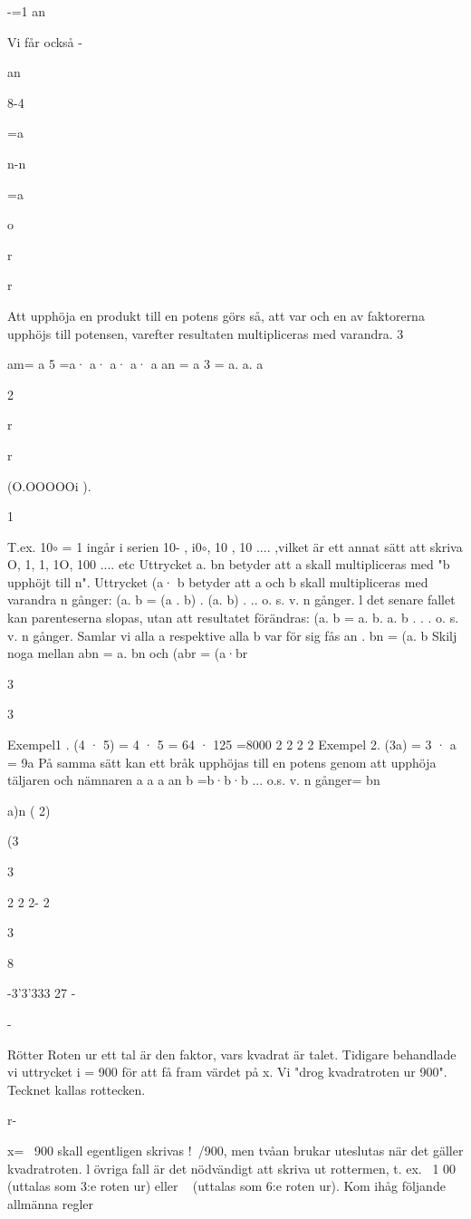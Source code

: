 -=1
an

Vi får också -

an

8-4

=a

n-n

=a

o

r

r

Att upphöja en produkt till en potens görs
så, att var och en av faktorerna upphöjs
till potensen, varefter resultaten multipliceras med varandra.
3

am= a 5 =a· a· a· a· a
an = a 3 = a. a. a

2

r

r

(O.OOOOOi ).

1

T.ex. 10$\circ$ = 1 ingår i serien 10- , i0$\circ$, 10 , 10
.... ,vilket är ett annat sätt att skriva O, 1, 1, 1O,
100 .... etc
Uttrycket a. bn betyder att a skall multipliceras med "b upphöjt till n".
Uttrycket (a· b betyder att a och b skall
multipliceras med varandra n gånger:
(a. b = (a . b) . (a. b) . .. o. s. v. n gånger.
l det senare fallet kan parenteserna slopas,
utan att resultatet förändras:
(a. b = a. b. a. b . . . o. s. v. n gånger.
Samlar vi alla a respektive alla b var för sig
fås an . bn = (a. b
Skilj noga mellan abn = a. bn
och
(abr = (a·br

3

3

Exempel1 . (4 · 5) = 4 · 5 = 64 · 125 =8000
2
2
2
2
Exempel 2. (3a) = 3 · a = 9a
På samma sätt kan ett bråk upphöjas till en
potens genom att upphöja täljaren och
nämnaren
a a a
an
b =b·b·b ... o.s. v. n gånger= bn

a)n
(
2)

(3

3

2 2 2- 2

3

8

-3'3'333 27
-

-

Rötter
Roten ur ett tal är den faktor, vars kvadrat är
talet.
Tidigare behandlade vi uttrycket i = 900 för
att få fram värdet på x. Vi "drog kvadratroten
ur 900".
Tecknet
kallas rottecken.

r-

x= ~900 skall egentligen skrivas !\ /900,
men tvåan brukar uteslutas när det gäller
kvadratroten. l övriga fall är det nödvändigt
att skriva ut rottermen, t. ex. ~1 00 (uttalas
som 3:e roten ur) eller ~ (uttalas som
6:e roten ur).
Kom ihåg följande allmänna regler


